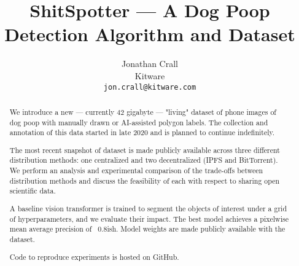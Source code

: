 \documentclass[10pt,twocolumn,letterpaper]{article}
\begin{document}
\title{ShitSpotter --- A Dog Poop Detection Algorithm and Dataset}

\author{Jonathan Crall\\
Kitware\\
{\tt\small jon.crall@kitware.com}
}
\maketitle


\begin{comment}
    cd $HOME/code/shitspotter
    python -m shitspotter.cli.coco_annotation_stats $HOME/data/dvc-repos/shitspotter_dvc/data.kwcoco.json \
        --dst_fpath $HOME/code/shitspotter/coco_annot_stats/stats.json \
        --dst_dpath $HOME/code/shitspotter/coco_annot_stats
\end{comment}

\begin{abstract}

We introduce a new --- currently 42 gigabyte --- "living" dataset of phone images of
dog poop with manually drawn or AI-assisted polygon labels.
The collection and annotation of this data started in late 2020 and is planned
to continue indefinitely.

The most recent snapshot of dataset is made publicly available across three
different distribution methods: one centralized and two decentralized (IPFS and
BitTorrent).
We perform an analysis and experimental comparison of the trade-offs between
distribution methods and discuss the feasibility of each with respect to
sharing open scientific data.

A baseline vision transformer is trained to segment the objects of interest
under a grid of hyperparameters, and we evaluate their impact. The best model
achieves a pixelwise mean average precision of ~0.8ish. 
Model weights are made publicly available with the dataset. 

Code to reproduce experiments is hosted on GitHub.


\end{abstract}
\end{document}
